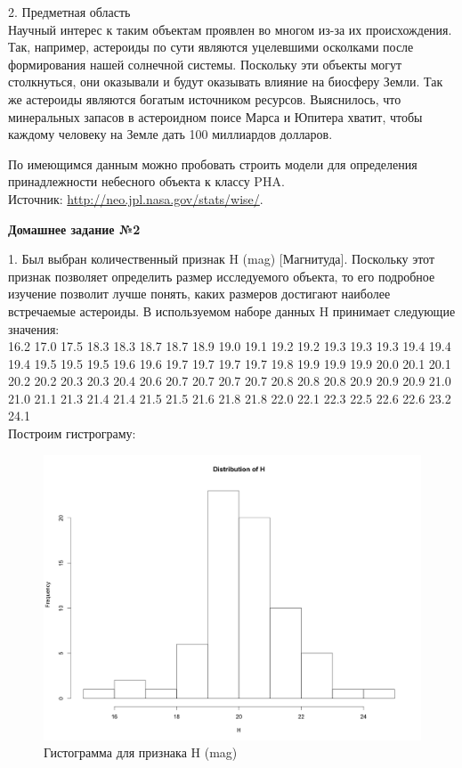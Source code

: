 \documentclass{article}
\begin{document}
2. Предметная область\\[0.15cm]

Научный интерес к таким объектам проявлен во многом из-за их происхождения. Так, например, астероиды по сути являются уцелевшими осколками после формирования нашей солнечной системы. Поскольку эти объекты могут столкнуться, они оказывали и будут оказывать влияние на биосферу Земли. Так же астероиды являются богатым источником ресурсов. Выяснилось, что минеральных запасов в астероидном поисе Марса и Юпитера хватит, чтобы каждому человеку на Земле дать 100 миллиардов долларов.

По имеющимся данным можно пробовать строить модели для определения принадлежности небесного объекта к классу PHA. \\[1cm]

Источник: \href{http://neo.jpl.nasa.gov/stats/wise/}{http://neo.jpl.nasa.gov/stats/wise/}. 

\vspace{.2cm}
\large \textbf{Домашнее задание №2}
\vspace{.2cm}

1. Был выбран количественный признак H (mag) [Магнитуда]. Поскольку этот признак позволяет определить размер исследуемого объекта, то его подробное изучение позволит лучше понять, каких размеров достигают наиболее встречаемые астероиды. В используемом наборе данных H принимает следующие значения: \\[0.15cm]
  16.2 17.0 17.5 18.3 18.3 18.7 18.7 18.9 19.0 19.1 19.2 19.2 19.3 19.3 19.3 19.4 19.4 19.4 19.5 19.5 19.5
 19.6 19.6 19.7 19.7 19.7 19.7 19.8 19.9 19.9 19.9 20.0 20.1 20.1 20.2 20.2 20.3 20.3 20.4 20.6 20.7 20.7 20.7
 20.7 20.8 20.8 20.8 20.9 20.9 20.9 21.0 21.0 21.1 21.3 21.4 21.4 21.5 21.5 21.6 21.8 21.8 22.0 22.1 22.3 22.5
 22.6 22.6 23.2 24.1 \\[0.15cm]
Построим гистрограму: 

\begin{figure}[H] 
\centering
\includegraphics[scale=0.4]{img/2_hist.png}
\caption{Гистограмма для признака H (mag)}
\label{fig :metka1}
\end{figure}
\end{document}
